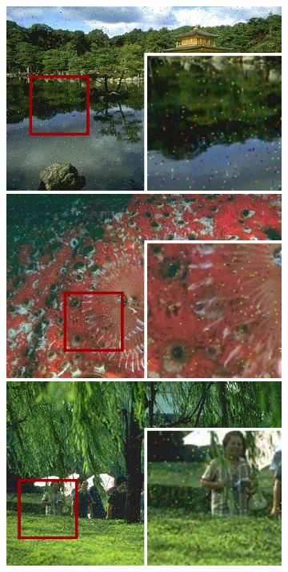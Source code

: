 \begin{figure}[!ht]
\begin{subfigure}[]{0.22\textwidth}
    \includegraphics[width=\textwidth]{./figures/sensor/berkeley/65010_noisy_frame.jpg}\vspace{0.1cm}\\
    \includegraphics[width=\textwidth]{./figures/sensor/berkeley/12084_noisy_frame.jpg}\vspace{0.1cm}\\
    \includegraphics[width=\textwidth]{./figures/sensor/berkeley/65033_noisy_frame.jpg}\vspace{0.1cm}\\

\end{subfigure}
\end{figure}
